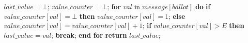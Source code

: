 \begin{algorithm}
\begin{algorithmic}[1]
		\State
		\State $last\_value = \bot$;
		\State $value\_counter = \bot$;
		\State \textbf{for} $val$ in $message[ballot]$ \textbf{do}
		\State \hspace{\algorithmicindent}\textbf{if} $value\_counter[val] = \bot$ \textbf{then}
		\State \hspace{\algorithmicindent}\hspace{\algorithmicindent}$value\_counter[val] = 1$;
		\State \hspace{\algorithmicindent}\textbf{else}
		\State \hspace{\algorithmicindent}\hspace{\algorithmicindent}$value\_counter[val] = value\_counter[val] + 1$; 
		\State
		\State \hspace{\algorithmicindent}\textbf{if} $value\_counter[val] > E$ \textbf{then}
		\State \hspace{\algorithmicindent}\hspace{\algorithmicindent}$last\_value = val$;
		\State \hspace{\algorithmicindent}\hspace{\algorithmicindent}\textbf{break};
		\State \textbf{end for}
		\State \textbf{return} $last\_value$;
		\EndFunction
		
		\iffalse \State
		\Function{proved\_safe}{Q, m}
		\State $k = max(i\ |\ (i < m) \wedge (\exists a \in Q :\ val_a[i]\ \neq null))$;
		\State $RS = \{R \in k$-$quorum\ |\ \forall a \in R \cap Q : val_a[k] \neq null\}$;
		\State $\gamma(R) = \sqcap \{v_a[k]\ |\ a \in Q \cap R \}$;
		\State $\Gamma = \{\gamma(R)\ |\ R \in RS \}$;
		\State
		\If{$RS = \varnothing$}
		\State \textbf{return} $\{val_a[k]\ |\ (a \in Q) \wedge (val_a[k] \neq null)\}$;
		\Else
		\State \textbf{return} $\sqcup \Gamma$;
		\EndIf
		\EndFunction
		\fi
		
	\end{algorithmic}
\end{algorithm}

